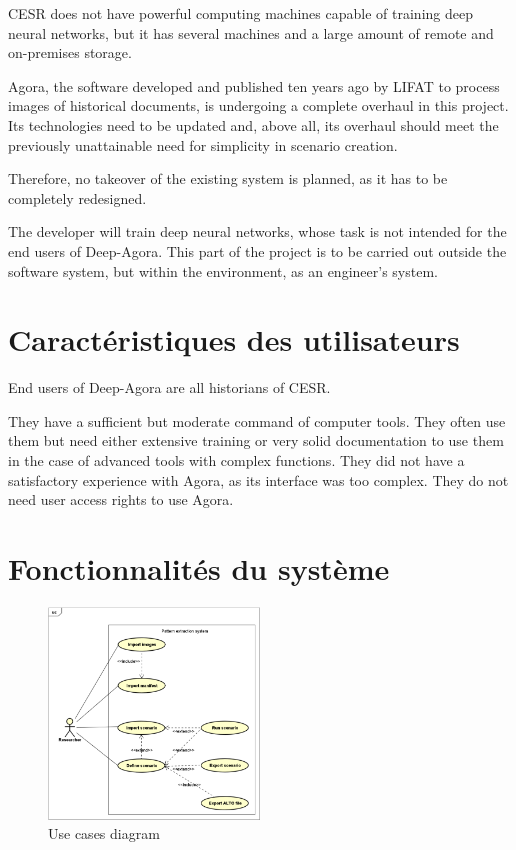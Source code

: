 \documentclass{polytech/polytech}
\numberwithin{figure}{chapter}
\begin{document}
CESR does not have powerful computing machines capable of training deep neural networks, but it has several machines and a large amount of remote and on-premises storage.

Agora, the software developed and published ten years ago by LIFAT to process images of historical documents, is undergoing a complete overhaul in this project. Its technologies need to be updated and, above all, its overhaul should meet the previously unattainable need for simplicity in scenario creation.

Therefore, no takeover of the existing system is planned, as it has to be completely redesigned.

The developer will train deep neural networks, whose task is not intended for the end users of Deep-Agora. This part of the project is to be carried out outside the software system, but within the environment, as an engineer's system.


\section{Caractéristiques des utilisateurs}

End users of Deep-Agora are all historians of CESR.

They have a sufficient but moderate command of computer tools.
They often use them but need either extensive training or very solid documentation to use them in the case of advanced tools with complex functions.
They did not have a satisfactory experience with Agora, as its interface was too complex.
They do not need user access rights to use Agora.


\section{Fonctionnalités du système}

\begin{figure}[ht] 
    \centering 
    \includegraphics[width=0.5\textwidth]{pic/20221116DiagUseCase.png} 
    \caption{Use cases diagram}
    \label{diagUC}
\end{figure}
\end{document}
